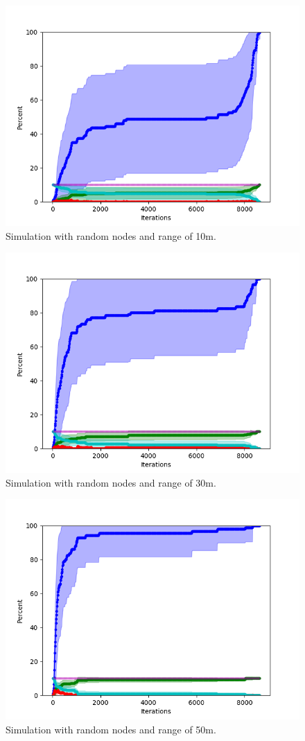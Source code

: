 \documentclass[conference]{IEEEtran}
\begin{document}
%
%
%


\begin{figure}
\centering
\includegraphics[width=0.5\linewidth]{Network_rA_10.0/new_plots/10.png}
\caption{Simulation with random nodes and range of 10m.} \label{fig:random10}
\end{figure}

\begin{figure}
\centering
\includegraphics[width=0.5\linewidth]{Network_rA_10.0/new_plots/30.png}
\caption{Simulation with random nodes and range of 30m.} \label{fig:random30}
\end{figure}

\begin{figure}
\centering
\includegraphics[width=0.5\linewidth]{Network_rA_10.0/new_plots/50.png}
\caption{Simulation with random nodes and range of 50m.} \label{fig:random50}
\end{figure}
\end{document}
